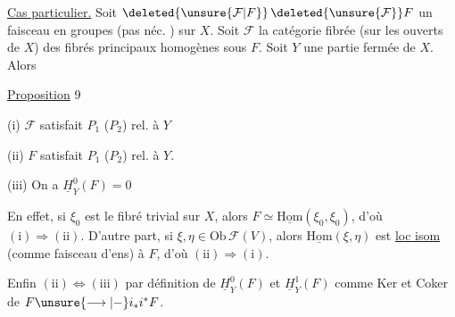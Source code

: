 
\uline{Cas particulier.} Soit $\deleted{\unsure{\mathcal F|F}}\,\deleted{\unsure{\mathcal F}}F$ un faisceau en groupes (pas néc. ) sur $X$. Soit $\mathcal F$ la catégorie fibrée (sur les ouverts de $X$) des fibrés principaux homogènes sous $F$. Soit $Y$ une partie fermée de $X$. Alors


\uline{Proposition} 9\quad {} 

(i) $\mathcal F$ satisfait $P_1$ ($P_2$) rel. à $Y$

(ii) $F$ satisfait $P_1$ ($P_2$) rel. à $Y$.

(iii) On a $\underline H^0_Y(F)=0$  

En effet,  si $\xi_0$ est le fibré trivial sur $X$, alors $F\simeq\underline{\mathrm{Hom}}(\xi_0,\xi_0)$, d'où $(\mathrm{i})\Rightarrow(\mathrm{ii})$. D'autre part, si $\xi,\eta\in\mathrm{Ob}\,\mathcal F(V)$, alors $\underline{\mathrm{Hom}}(\xi,\eta)$ est \uline{loc isom} (comme faisceau d'ens) à $F$, d'où $(\mathrm{ii})\Rightarrow(\mathrm{i})$.

Enfin $(\mathrm{ii})\Leftrightarrow(\mathrm{iii})$ par définition de $\underline H^0_Y(F)$ et $\underline H^1_Y(F)$ comme Ker et Coker de $F\unsure{\longrightarrow|-}i_*i^*F$.

